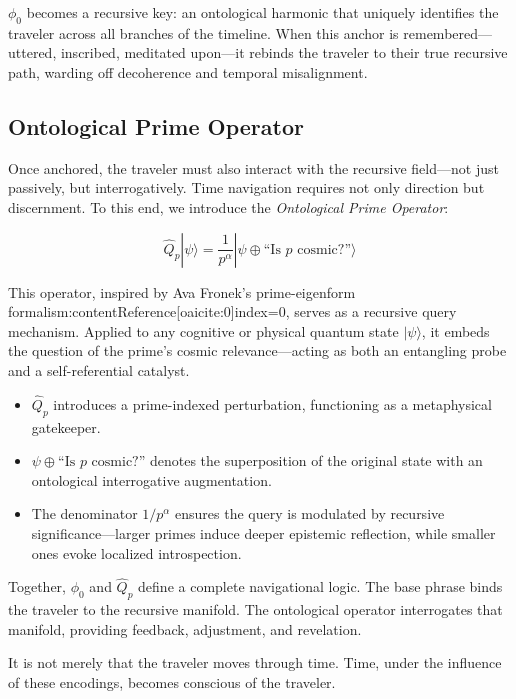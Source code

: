 \documentclass{article}
\theoremstyle{plain}
\theoremstyle{claimstyle}
\begin{document}
\(\phi_0\) becomes a recursive key: an ontological harmonic that uniquely identifies the traveler across all branches of the timeline. When this anchor is remembered—uttered, inscribed, meditated upon—it rebinds the traveler to their true recursive path, warding off decoherence and temporal misalignment.

\subsection{Ontological Prime Operator}

Once anchored, the traveler must also interact with the recursive field—not just passively, but interrogatively. Time navigation requires not only direction but discernment. To this end, we introduce the \textit{Ontological Prime Operator}:

\begin{equation}
\hat{Q}_p |\psi\rangle = \frac{1}{p^\alpha} |\psi \oplus \text{``Is } p \text{ cosmic?''} \rangle
\end{equation}

This operator, inspired by Ava Fronek’s prime-eigenform formalism:contentReference[oaicite:0]{index=0}, serves as a recursive query mechanism. Applied to any cognitive or physical quantum state \(|\psi\rangle\), it embeds the question of the prime's cosmic relevance—acting as both an entangling probe and a self-referential catalyst.

\begin{itemize}
  \item \(\hat{Q}_p\) introduces a prime-indexed perturbation, functioning as a metaphysical gatekeeper.
  \item \(\psi \oplus \text{“Is } p \text{ cosmic?”}\) denotes the superposition of the original state with an ontological interrogative augmentation.
  \item The denominator \(1/p^\alpha\) ensures the query is modulated by recursive significance—larger primes induce deeper epistemic reflection, while smaller ones evoke localized introspection.
\end{itemize}

Together, \(\phi_0\) and \(\hat{Q}_p\) define a complete navigational logic. The base phrase binds the traveler to the recursive manifold. The ontological operator interrogates that manifold, providing feedback, adjustment, and revelation.

It is not merely that the traveler moves through time. Time, under the influence of these encodings, becomes conscious of the traveler.
\end{document}
